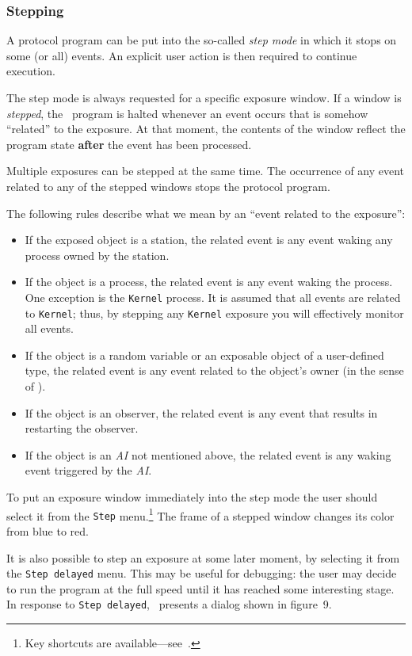 \subsubsection{Stepping}
\label{rm_ds_wm_sm}

A protocol program can be put into the so-called
{\em step mode\/} in which it stops on some (or all) events.
An explicit user action is then required to continue execution.

The step mode is always requested for a specific exposure window.
If a window is {\em stepped}, the \smurph\ program is halted whenever an event
occurs that is somehow ``related'' to the exposure.
At that moment,
the contents of the window reflect the program state {\bf after}
the event has been processed.

Multiple exposures can be stepped at the same time.
The occurrence of any event related to any of the stepped windows stops the
protocol program.

The following rules describe what we mean by an
``event related to the exposure'':
\begin{itemize}
\item
If the exposed object is a station, the related event is any
event waking any process owned by the station.
\item
If the object is a process, the related event is any event waking the process.
One exception is the {\tt Kernel} process.
It is assumed that all events are related to {\tt Kernel}; thus, by
stepping any {\tt Kernel} exposure you will effectively monitor all events.
\item
If the object is a random variable or an
exposable object of a user-defined type,
the related event is any event related to the object's owner (in the
sense of ).
\item
If the object is an observer, the related event is any
event that results in restarting the observer.
\item
If the object is an {\em AI\/} not mentioned above, the related event
is any waking event triggered by the {\em AI}.
\end{itemize}

To put an exposure window immediately
into the step mode the user should select it from the {\tt Step}
menu.\footnote{Key shortcuts are available---see~.}
The frame of a stepped window changes its color from blue to red.

It is also possible to step an exposure at some later moment, by selecting
it from the {\tt Step~delayed} menu.
This may be useful for debugging: the user may decide to run the program
at the full speed until it has reached some interesting stage.
In response to {\tt Step~delayed}, \dsd\ presents a dialog shown
in
figure~9.

